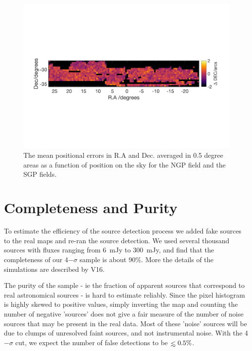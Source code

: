 \documentclass[useAMS,usenatbib]{mn2e}
\def\lesssim{\mathrel{\hbox{\rlap{\hbox{\lower4pt\hbox{$\sim$}}}\hbox{$<$}}}}
\begin{document}
\begin{figure}
\includegraphics[scale=0.6,trim={0 60mm 0mm 80mm}, clip]{sgp_ddec.png}
\caption{\protect\label{fig_pos_errs} The mean positional errors in
  R.A and Dec. averaged in 0.5 degree areas as a
  function of position on the sky for the NGP field and the SGP
  fields. 
}
\end{figure} 



\section{Completeness and Purity}

To estimate the efficiency of the source detection process we added
fake sources to the real maps and re-ran the source detection.  We
used several thousand sources with fluxes ranging from 6\ mJy to
300\ mJy, and find that the completeness of our 4$-\sigma$ sample is
about 90\%.  More the details of the simulations are described by V16.

The purity of the sample - ie the fraction of apparent sources that
correspond to real astronomical sources - is hard to estimate
reliably. Since the pixel histogram is highly skewed to positive
values, simply inverting the map and counting the number of negative
'sources' does not give a fair measure of the number of noise sources
that may be present in the real data. Most of these 'noise' sources will
be due to clumps of unresolved faint sources, and not instrumental
noise. With the 4$-\sigma$ cut, we expect the number of false
detections to be $\lesssim 0.5\%$. 


%
\end{document}
